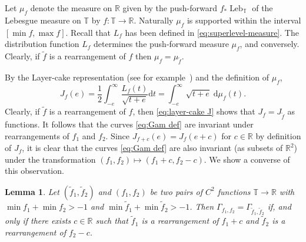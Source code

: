 \documentclass[11pt,letterpaper,oneside]{amsart}
\newcommand{\R}{\mathbb{R}}
\newcommand{\T}{\mathbb{T}}
\newtheorem{lemm}[theo]{Lemma}
\theoremstyle{definition}
\theoremstyle{remark}
\newcommand{\wt}{\widetilde}
\theoremstyle{definition}
\theoremstyle{remark}
\DeclareMathOperator{\leb}{Leb}
\newcommand{\dif}{\mathrm{d}}
\begin{document}
\medskip

Let $\mu_f$ denote the measure on $\R$ given by the push-forward $f_* \leb_{\T}$ of the Lebesgue measure on $\T$ by $f: \T \to \R$. Naturally $\mu_f$ is supported within the interval $[\min f, \max f]$. 
Recall that $L_f$ has been defined in \eqref{eq:superlevel-measure}.
The distribution function $L_f$ determines the push-forward measure $\mu_f$, and conversely. Clearly, if $\wt f$ is a rearrangement of $f$ then $\mu_f = \mu_{\wt f}$. 

\medskip

By the Layer-cake representation (see for example~\cite[Ch. 1.13]{LiebLoss}) and the definition of $\mu_f$,
\begin{equation}\label{eq:layer-cake J}
	J_f(e) = \frac{1}{2} \int_{-e}^\infty \frac{L_f(t)}{\sqrt{t + e}} \dif t = \int_{-e}^\infty \sqrt{t + e} \;\dif \mu_f(t).
\end{equation}
Clearly, if $\wt f$ is a rearrangement of $f$, then \eqref{eq:layer-cake J} shows that $J_f = J_{\wt f}$ as functions. 
It follows that the curves \eqref{eq:Gam def} are invariant under rearrangements of $f_1$ and $f_2$.
Since $J_{f+c}(e) = J_f(e + c)$ for $c \in \R$ by definition of $J_f$, it is clear that the curves \eqref{eq:Gam def} are also invariant (as subsets of $\R^2$) under the transformation $(f_1, f_2) \mapsto (f_1 + c, f_2 - c)$.
We show a converse of this observation.
\begin{lemm}\label{lem:Gam determines f12}
	Let $(\wt f_1, \wt f_2)$ and $(f_1, f_2)$ be two pairs of $C^2$ functions $\T \to \R$ with $\min f_1 + \min f_2 > -1$ and $\min \wt f_1 + \min \wt f_2 > -1$.
	Then $\Gamma_{f_1, f_2} = \Gamma_{\wt f_1, \wt f_2}$ if, and only if there exists $c \in \R$ such that $\wt f_1$ is a rearrangement of $f_1 + c$ and $\wt f_2$ is a rearrangement of $f_2 - c$.
\end{lemm}
\end{document}
